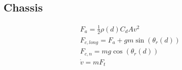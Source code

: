 \documentclass[../SimBALink.tex]{subfiles}
\begin{document}
\subsection{Chassis}

\begin{gather}
F_a = \frac{1}{2}\rho(d)C_dAv^2 \\
F_{c,long}  = F_a + gm\sin(\theta_r (d))  \\
F_{c,n} = mg\cos(\theta_r (d)) \\
\dot{v} = mF_t
\end{gather}
\end{document}
